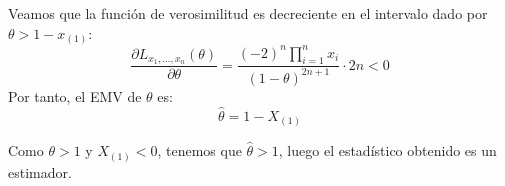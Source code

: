 \begin{ejercicio}[Reto]
\begin{description}
        Veamos que la función de verosimilitud es decreciente en el intervalo dado por $\theta > 1 - x_{(1)}$:
        \begin{equation*}
            \frac{\partial L_{x_1,\ldots,x_n}(\theta)}
            {\partial \theta} = \frac{(-2)^n \prod\limits_{i=1}^{n} x_i}{(1-\theta)^{2n+1}} \cdot 2n <0
        \end{equation*}
        Por tanto, el EMV de $\theta$ es:
        \begin{equation*}
            \widehat{\theta} = 1 - X_{(1)}
        \end{equation*}

        Como $\theta>1$ y $X_{(1)}<0$, tenemos que $\widehat{\theta}>1$, luego el estadístico obtenido es un estimador.
    \end{description}
\end{ejercicio}



